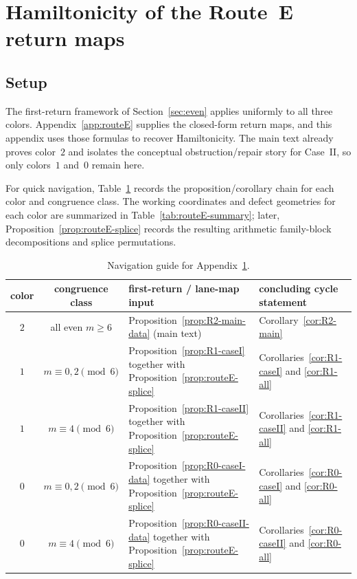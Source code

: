 \documentclass[11pt]{article}
\begin{document}
\section{Hamiltonicity of the Route~E return maps}\label{app:routeE-cycle}

\subsection{Setup}

The first-return framework of Section~\ref{sec:even} applies uniformly to all three colors.
Appendix~\ref{app:routeE} supplies the closed-form return maps, and this appendix uses those formulas to recover Hamiltonicity.
The main text already proves color~$2$ and isolates the conceptual obstruction/repair story for Case~II, so only colors~$1$ and~$0$ remain here.

For quick navigation, Table~\ref{tab:appendix-cycle-guide} records the proposition/corollary chain for each color and congruence class.
The working coordinates and defect geometries for each color are summarized in Table~\ref{tab:routeE-summary}; later, Proposition~\ref{prop:routeE-splice} records the resulting arithmetic family-block decompositions and splice permutations.

\begin{table}[H]
\centering
\footnotesize
\renewcommand{\arraystretch}{1.15}
\begin{tabularx}{\textwidth}{@{}c c >{\raggedright\arraybackslash}X >{\raggedright\arraybackslash}X@{}}
\toprule
color & congruence class & first-return / lane-map input & concluding cycle statement \\
\midrule
$2$ & all even $m\ge 6$ & Proposition~\ref{prop:R2-main-data} (main text) & Corollary~\ref{cor:R2-main} \\
$1$ & $m\equiv 0,2\pmod 6$ & Proposition~\ref{prop:R1-caseI} together with Proposition~\ref{prop:routeE-splice} & Corollaries~\ref{cor:R1-caseI} and \ref{cor:R1-all} \\
$1$ & $m\equiv 4\pmod 6$ & Proposition~\ref{prop:R1-caseII} together with Proposition~\ref{prop:routeE-splice} & Corollaries~\ref{cor:R1-caseII} and \ref{cor:R1-all} \\
$0$ & $m\equiv 0,2\pmod 6$ & Proposition~\ref{prop:R0-caseI-data} together with Proposition~\ref{prop:routeE-splice} & Corollaries~\ref{cor:R0-caseI} and \ref{cor:R0-all} \\
$0$ & $m\equiv 4\pmod 6$ & Proposition~\ref{prop:R0-caseII-data} together with Proposition~\ref{prop:routeE-splice} & Corollaries~\ref{cor:R0-caseII} and \ref{cor:R0-all} \\
\bottomrule
\end{tabularx}
\caption{Navigation guide for Appendix~\ref{app:routeE-cycle}.}
\label{tab:appendix-cycle-guide}
\end{table}
\end{document}
